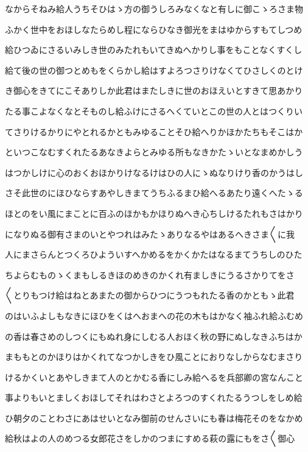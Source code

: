 \documentclass[a4paper,11pt,landscape]{ltjtarticle}
\begin{document}
なからそねみ給人うちそひはゝ方の御うしろみなくなと有しに御こゝろさま物
\par\medskip
ふかく世中をおほしなたらめし程にならひなき御光をまはゆからすもてしつめ
\par\medskip
給ひつゐにさるいみしき世のみたれもいてきぬへかりし事をもことなくすくし
\par\medskip
給て後の世の御つとめもをくらかし給はすよろつさりけなくてひさしくのとけ
\par\medskip
き御心をきてにこそありしか此君はまたしきに世のおほえいとすきて思あかり
\par\medskip
たる事こよなくなとそものし給ふけにさるへくていとこの世の人とはつくりい
\par\medskip
てさりけるかりにやとれるかともみゆることそひ給へりかほかたちもそこはか
\par\medskip
といつこなむすくれたるあなきよらとみゆる所もなきかたゝいとなまめかしう
\par\medskip
はつかしけに心のおくおほかりけなるけはひの人にゝぬなりけり香のかうはし
\par\medskip
さそ此世のにほひならすあやしきまてうちふるまひ給へるあたり遠くへたゝる
\par\medskip
ほとのをい風にまことに百ふのほかもかほりぬへき心ちしけるたれもさはかり
\par\medskip
になりぬる御有さまのいとやつれはみたゝありなるやはあるへきさま〱に我
\par\medskip
人にまさらんとつくろひよういすへかめるをかくかたはなるまてうちしのひた
\par\medskip
ちよらむものゝくまもしるきほのめきのかくれ有ましきにうるさかりてをさ
\par\medskip
〱とりもつけ給はねとあまたの御からひつにうつもれたる香のかともゝ此君
\par\medskip
のはいふよしもなきにほひをくはへおまへの花の木もはかなく袖ふれ給ふむめ
\par\medskip
の香は春さめのしつくにもぬれ身にしむる人おほく秋の野にぬしなきふちはか
\par\medskip
まももとのかほりはかくれてなつかしきをひ風ことにおりなしからなむまさり
\par\medskip
けるかくいとあやしきまて人のとかむる香にしみ給へるを兵部卿の宮なんこと
\par\medskip
事よりもいとましくおほしてそれはわさとよろつのすくれたるうつしをしめ給
\par\medskip
ひ朝夕のことわさにあはせいとなみ御前のせんさいにも春は梅花そのをなかめ
\par\medskip
給秋はよの人のめつる女郎花さをしかのつまにすめる萩の露にもをさ〱御心
\end{document}
